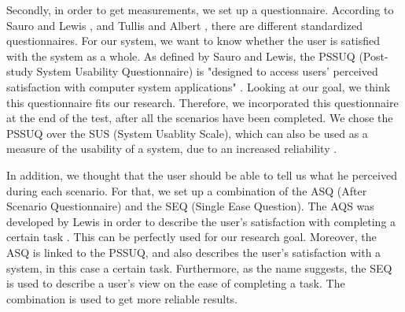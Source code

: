 \documentclass[11pt,a4paper]{article}
\begin{document}
Secondly, in order to get measurements, we set up a questionnaire. According to Sauro and Lewis \cite{sauro2012quantifying}, and Tullis and Albert \cite{albert2013measuring}, there are different standardized questionnaires. For our system, we want to know whether the user is satisfied with the system as a whole. As defined by Sauro and Lewis, the PSSUQ (Post-study System Usability Questionnaire) is "designed to access users' perceived satisfaction with computer system applications" \cite{sauro2012quantifying}. Looking at our goal, we think this questionnaire fits our research. Therefore, we incorporated this questionnaire at the end of the test, after all the scenarios have been completed. We chose the PSSUQ over the SUS (System Usablity Scale), which can also be used as a measure of the usability of a system, due to an increased reliability \cite{sauro2012quantifying}.

In addition, we thought that the user should be able to tell us what he perceived during each scenario. For that, we set up a combination of the ASQ (After Scenario Questionnaire) and the SEQ (Single Ease Question). The AQS was developed by Lewis in order to describe the user's satisfaction with completing a certain task \cite{sauro2012quantifying}\cite{lewis1995ibm}. This can be perfectly used for our research goal. Moreover, the ASQ is linked to the PSSUQ, and also describes the user's satisfaction with a system, in this case a certain task. Furthermore, as the name suggests, the SEQ is used to describe a user's view on the ease of completing a task. The combination is used to get more reliable results.
\end{document}
